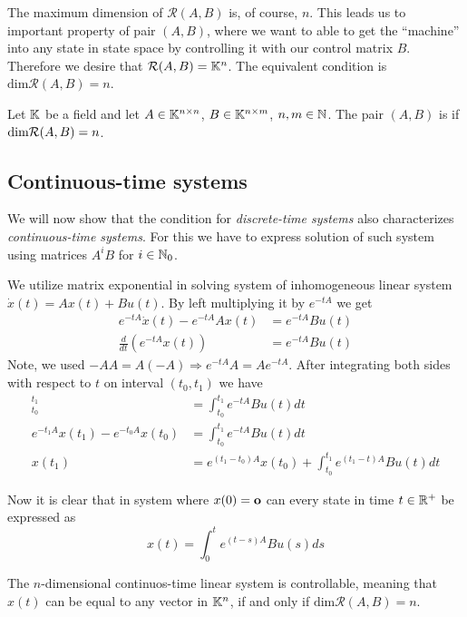 The maximum dimension of $\mathcal{R}(A,B)$ is, of course, $n$. This leads us to important property of pair $(A,B)$, where we want to able to get the ``machine'' into any state in state space by controlling it with our control matrix $B$. Therefore we desire that $\mathcal{R}(A,B)=\mathbb{K}^n$. The equivalent condition is $\text{dim}\mathcal{R}(A,B)=n$.

\begin{definition}
	Let $\mathbb{K}$ be a field and let $A \in \mathbb{K}^{n \times n}$, $B \in \mathbb{K}^{n \times m}$, $n,m \in \mathbb{N}$. The pair $(A,B)$ is  if $\textnormal{dim}\mathcal{R}(A,B)=n$.
\end{definition}

\subsection{Continuous-time systems}

We will now show that the condition for \textit{discrete-time systems} also characterizes \textit{continuous-time systems}. For this we have to express solution of such system using matrices $A^iB$ for $i\in \mathbb{N}_0$. 

We utilize matrix exponential in solving system of inhomogeneous linear system $\dot{x}(t)=Ax(t)+Bu(t)$. By left multiplying it by $e^{-tA}$ we get
\begin{align*}
	e^{-tA}\dot{x}(t)-e^{-tA}Ax(t) &=e^{-tA}Bu(t) \\
	\frac{d}{dt} (e^{-tA}x(t)) &=e^{-tA}Bu(t) 
\end{align*}
Note, we used $-AA=A(-A)\Rightarrow e^{-tA}A=Ae^{-tA}$. After integrating both sides with respect to $t$ on interval $(t_0,t_1)$ we have 
\begin{align*}
	[e^{-tA}x(t)]^{t_1}_{t_0}&=\int^{t_1}_{t_0}e^{-tA}Bu(t)dt \\
	e^{-t_1A}x(t_1)-e^{-t_0A}x(t_0)&=\int^{t_1}_{t_0}e^{-tA}Bu(t)dt \\
	x(t_1)&=e^{(t_1-t_0)A}x(t_0)+\int^{t_1}_{t_0}e^{(t_1-t)A}Bu(t)dt
\end{align*}

Now it is clear that in system where $x(0)=\textbf{o}$ can every state in time $t\in \mathbb{R}^+$ be expressed as $$x(t)=\int^t_0 e^{(t-s)A}Bu(s)ds$$

\begin{theorem}
	The $n$-dimensional continuos-time linear system is controllable, meaning that $x(t)$ can be equal to any vector in $\mathbb{K}^n$, if and only if $\text{dim}\mathcal{R}(A,B)=n$.
\end{theorem}

